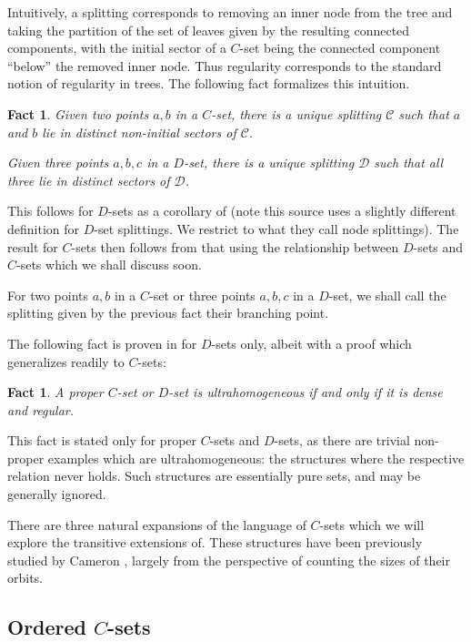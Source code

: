 \documentclass{amsart}
\newtheorem{fact}[theorem]{Fact}
\begin{document}
Intuitively, a splitting corresponds to removing an inner node from the tree and taking the partition of the set of leaves given by the resulting connected components, with the initial sector of a $C$-set being the connected component ``below'' the removed inner node. Thus regularity corresponds to the standard notion of regularity in trees. The following fact formalizes this intuition.

\begin{fact}
    Given two points $a,b$ in a $C$-set, there is a unique splitting $\mathcal{C}$ such that $a$ and $b$ lie in distinct non-initial sectors of $\mathcal{C}$.

    Given three points $a,b,c$ in a $D$-set, there is a unique splitting $\mathcal{D}$ such that all three lie in distinct sectors of $\mathcal{D}$.
\end{fact}

This follows for $D$-sets as a corollary of \cite[Lemma 4.2]{estrada2025model} (note this source uses a slightly different definition for $D$-set splittings. We restrict to what they call node splittings). The result for $C$-sets then follows from that using the relationship between $D$-sets and $C$-sets which we shall discuss soon.

For two points $a,b$ in a $C$-set or three points $a,b,c$ in a $D$-set, we shall call the splitting given by the previous fact their branching point.

The following fact is proven in \cite[Theorem 1]{estrada2025model} for $D$-sets only, albeit with a proof which generalizes readily to $C$-sets:

\begin{fact}
    A proper $C$-set or $D$-set is ultrahomogeneous if and only if it is dense and regular.
\end{fact}

This fact is stated only for proper $C$-sets and $D$-sets, as there are trivial non-proper examples which are ultrahomogeneous: the structures where the respective relation never holds. Such structures are essentially pure sets, and may be generally ignored.



There are three natural expansions of the language of $C$-sets which we will explore the transitive extensions of. These structures have been previously studied by Cameron \cite{cameron1987some}, largely from the perspective of counting the sizes of their orbits.

\subsection{Ordered $C$-sets}
\end{document}
